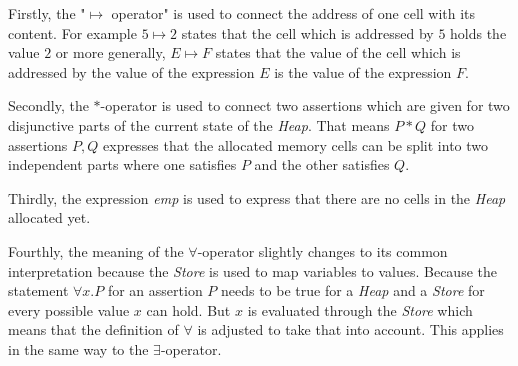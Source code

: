 	Firstly, the "$\mapsto$ operator" is used to connect the address of one cell
	with its content. For example $5\mapsto 2$ states that the cell which is
	addressed by $5$ holds the value $2$ or more generally, $E\mapsto F$ states
	that the value of the cell which is addressed by the value of the expression
	$E$ is the value of the expression $F$.

	Secondly, the $\ast$-operator is used to connect two assertions which are
	given for two disjunctive parts of the current state of the \emph{Heap}.
	That means $P\ast Q$ for two assertions $P,Q$
	expresses that the allocated memory cells can be split into two independent
	parts where one satisfies $P$ and the other satisfies $Q$.

	Thirdly, the expression \textit{emp} is used to express that there are no cells
	in the \emph{Heap} allocated yet.

	Fourthly, the meaning of the $\forall$-operator slightly changes to its common
	interpretation because the
	\emph{Store} is used to map variables to values. Because the statement
	$\forall x.P$ for an assertion $P$ needs to be true for
	a \emph{Heap} and a \emph{Store} for every possible value $x$ can hold. But
	$x$ is evaluated through the \emph{Store} which means that the definition of
	$\forall$ is adjusted to take that into account. This applies in the same way
	to the $\exists$-operator.

